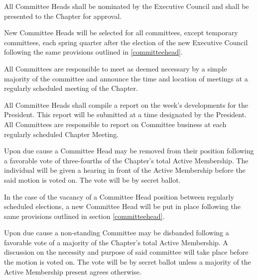 \documentclass[11pt]{article}
\begin{document}
\begin{legal}
    All Committee Heads shall be nominated by the Executive Council and shall be presented to the Chapter for approval.
  \item
    New Committee Heads will be selected for all committees, except temporary committees, each spring quarter after the election of the new Executive Council following the same provisions outlined in \ref{committeehead}.
  \item
    All Committees are responsible to meet as deemed necessary by a simple majority of the committee and announce the time and location of meetings at a regularly scheduled meeting of the Chapter.
  \item
    All Committee Heads shall compile a report on the week’s developments for the President.
    This report will be submitted at a time designated by the President.
    All Committees are responsible to report on Committee business at each regularly scheduled Chapter Meeting.
  \item
    Upon due cause a Committee Head may be removed from their position following a favorable vote of three-fourths of the Chapter’s total Active Membership.
    The individual will be given a hearing in front of the Active Membership before the said motion is voted on.
    The vote will be by secret ballot.
  \item
    In the case of the vacancy of a Committee Head position between regularly scheduled elections, a new Committee Head will be put in place following the same provisions outlined in section \ref{committeehead}.
  \item
    Upon due cause a non-standing Committee may be disbanded following a favorable vote of a majority of the Chapter’s total Active Membership.
    A discussion on the necessity and purpose of said committee will take place before the motion is voted on.
    The vote will be by secret ballot unless a majority of the Active Membership present agrees otherwise.
\end{legal}
\end{document}
